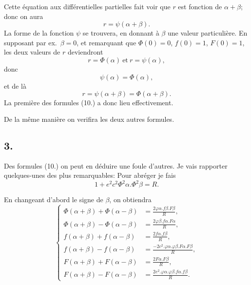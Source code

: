 \documentclass{article}
\begin{document}
Cette équation aux différentielles partielles fait voir que $r$ est fonction de $\alpha+\beta$; donc on aura
\[ r=\psi(\alpha+\beta). \]
La forme de la fonction $\psi$ se trouvera, en donnant à $\beta$ une valeur particulière. En supposant par ex.\ $\beta=0$, et remarquant que $\Phi(0)=0$, $f(0)=1$, $F(0)=1$, les deux valeurs de $r$ deviendront
\[ r=\Phi(\alpha)\ \text{et}\ r=\psi(\alpha), \]
donc
\[ \psi(\alpha)=\Phi(\alpha), \]
et de là
\[ r=\psi(\alpha+\beta)=\Phi(\alpha+\beta). \]
La première des formules (10.) a donc lieu effectivement.

De la même manière on verifira les deux autres formules.


\subsection*{3.}

Des formules (10.) on peut en déduire une foule d'autres. Je vais rapporter quelques-unes des plus remarquables: Pour abréger je fais
\[ 1+e^{2}c^{2}\Phi^{2}\alpha.\Phi^{2}\beta=R. \tag{11.} \]

En changeant d'abord le signe de $\beta$, on obtiendra
\[ \left\{\begin{aligned} \Phi(\alpha+\beta)+\Phi(\alpha-\beta)&=\frac{2\varphi\alpha.f\beta.F\beta}{R},\\ \Phi(\alpha+\beta)-\Phi(\alpha-\beta)&=\frac{2\varphi\beta.f\alpha.F\alpha}{R},\\ f(\alpha+\beta)+f(\alpha-\beta)&=\frac{2f\alpha.f\beta}{R},\\ f(\alpha+\beta)-f(\alpha-\beta)&=\frac{-2c^{2}.\varphi\alpha.\varphi\beta.F\alpha.F\beta}{R},\\ F(\alpha+\beta)+F(\alpha-\beta)&=\frac{2F\alpha.F\beta}{R},\\ F(\alpha+\beta)-F(\alpha-\beta)&=\frac{2e^{2}.\varphi\alpha.\varphi\beta.f\alpha.f\beta}{R}. \end{aligned}\right. \tag{12.} \]
\end{document}
